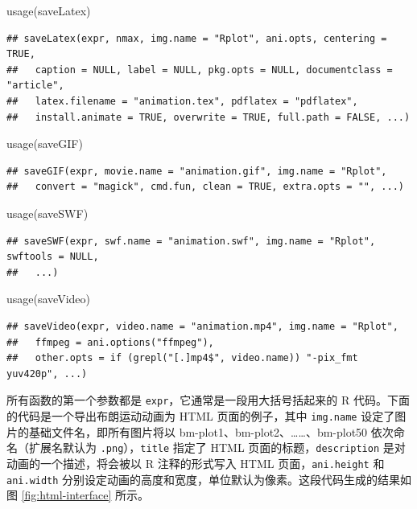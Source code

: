 \documentclass[
  b5paper,
  UTF8,twoside]{book}
\newenvironment{Shaded}{\begin{snugshade}}{\end{snugshade}}
\newcommand{\FunctionTok}[1]{\textcolor[rgb]{0.00,0.00,0.00}{#1}}
\newcommand{\NormalTok}[1]{#1}
\begin{document}
\begin{Shaded}
\begin{Highlighting}[]
\FunctionTok{usage}\NormalTok{(saveLatex)}
\end{Highlighting}
\end{Shaded}

\begin{verbatim}
## saveLatex(expr, nmax, img.name = "Rplot", ani.opts, centering = TRUE,
##   caption = NULL, label = NULL, pkg.opts = NULL, documentclass = "article",
##   latex.filename = "animation.tex", pdflatex = "pdflatex",
##   install.animate = TRUE, overwrite = TRUE, full.path = FALSE, ...)
\end{verbatim}

\begin{Shaded}
\begin{Highlighting}[]
\FunctionTok{usage}\NormalTok{(saveGIF)}
\end{Highlighting}
\end{Shaded}

\begin{verbatim}
## saveGIF(expr, movie.name = "animation.gif", img.name = "Rplot",
##   convert = "magick", cmd.fun, clean = TRUE, extra.opts = "", ...)
\end{verbatim}

\begin{Shaded}
\begin{Highlighting}[]
\FunctionTok{usage}\NormalTok{(saveSWF)}
\end{Highlighting}
\end{Shaded}

\begin{verbatim}
## saveSWF(expr, swf.name = "animation.swf", img.name = "Rplot", swftools = NULL,
##   ...)
\end{verbatim}

\begin{Shaded}
\begin{Highlighting}[]
\FunctionTok{usage}\NormalTok{(saveVideo)}
\end{Highlighting}
\end{Shaded}

\begin{verbatim}
## saveVideo(expr, video.name = "animation.mp4", img.name = "Rplot",
##   ffmpeg = ani.options("ffmpeg"),
##   other.opts = if (grepl("[.]mp4$", video.name)) "-pix_fmt yuv420p", ...)
\end{verbatim}

所有函数的第一个参数都是 \texttt{expr}，它通常是一段用大括号括起来的 R 代码。下面的代码是一个导出布朗运动动画为 HTML 页面的例子，其中 \texttt{img.name} 设定了图片的基础文件名，即所有图片将以 bm-plot1、bm-plot2、\ldots\ldots、bm-plot50 依次命名（扩展名默认为 \texttt{.png}），\texttt{title} 指定了 HTML 页面的标题，\texttt{description} 是对动画的一个描述，将会被以 R 注释的形式写入 HTML 页面，\texttt{ani.height} 和 \texttt{ani.width} 分别设定动画的高度和宽度，单位默认为像素。这段代码生成的结果如图 \ref{fig:html-interface} 所示。
\end{document}
